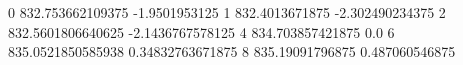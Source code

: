 0 832.753662109375 -1.9501953125
1 832.4013671875 -2.302490234375
2 832.5601806640625 -2.1436767578125
4 834.703857421875 0.0
6 835.0521850585938 0.34832763671875
8 835.19091796875 0.487060546875
